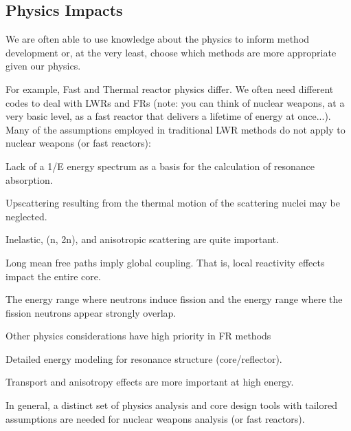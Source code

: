 \documentclass[12pt]{article}
\begin{document}
\subsection*{Physics Impacts}
We are often able to use knowledge about the physics to inform method development or, at the very least, choose which methods are more appropriate given our physics. 

For example, Fast and Thermal reactor physics differ. We often need different codes to deal with LWRs and FRs (note: you can think of nuclear weapons, at a very basic level, as a fast reactor that delivers a lifetime of energy at once...). 
%
Many of the assumptions employed in traditional LWR methods do not apply to nuclear weapons (or fast reactors):
\begin{compactitem}
\item Lack of a 1/E energy spectrum as a basis for the calculation of resonance absorption.
\item Upscattering resulting from the thermal motion of the scattering nuclei may be neglected.
\item Inelastic, (n, 2n), and anisotropic scattering are quite important.
\item Long mean free paths imply global coupling. That is, local reactivity effects impact the entire core.  
\item The energy range where neutrons induce fission and the energy range where the fission neutrons appear strongly overlap.
\end{compactitem}
%
Other physics considerations have high priority in FR methods
\begin{compactitem}
\item Detailed energy modeling for resonance structure (core/reflector).
\item Transport and anisotropy effects are more important at high energy.
\end{compactitem}
%
In general, a distinct set of physics analysis and core design tools with tailored assumptions are needed for nuclear weapons analysis (or fast reactors).
\end{document}
